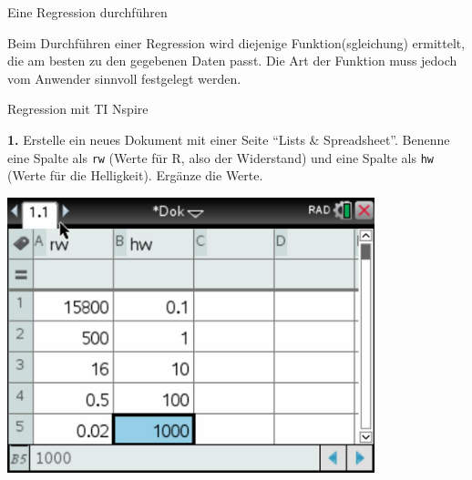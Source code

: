 
\begin{zsfg}{Eine Regression durchführen}
	
	Beim Durchführen einer Regression wird diejenige Funktion(sgleichung) ermittelt, die am besten zu den gegebenen Daten passt. Die Art der Funktion muss jedoch vom Anwender sinnvoll festgelegt werden.
\end{zsfg}	
\begin{zsfg}{Regression mit TI Nspire}
	
	\smallskip
	\begin{minipage}[c][4.5cm][t]{0.48\textwidth}
		\textbf{1.} Erstelle ein neues Dokument mit einer Seite \enquote{Lists \& Spreadsheet}. Benenne eine Spalte als \texttt{rw} (Werte für R, also der Widerstand) und eine Spalte als \texttt{hw} (Werte für die Helligkeit). Ergänze die Werte.
	\end{minipage}
	\hfill
	\begin{minipage}[c][4.5cm][t]{0.48\textwidth}
		\centering
		\includegraphics[width=0.8\textwidth]{./pics/RegressionLDR-TI-1.jpg}
	\end{minipage}
	

\end{zsfg}
